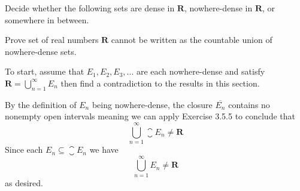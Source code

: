 \begin{exercise}
  Decide whether the following sets are dense in $\mathbf{R}$, nowhere-dense in $\mathbf{R}$, or somewhere in between.
\end{exercise}

\begin{solution}
\end{solution}

\begin{exercise}
  Prove set of real numbers $\mathbf{R}$ cannot be written as the countable union of nowhere-dense sets.
  
  To start, assume that $E_{1}, E_{2}, E_{3}, \ldots$ are each nowhere-dense and satisfy $\mathbf{R}=\bigcup_{n=1}^{\infty} E_{n}$ then find a contradiction to the results in this section.
\end{exercise}

\begin{solution}
  By the definition of $E_n$ being nowhere-dense, the closure $\overline{E_n}$ contains no nonempty open intervals meaning we can apply Exercise 3.5.5 to conclude that
  $$
  \bigcup_{n=1}^\infty \closure{E_n} \ne \mathbf{R}
  $$
  Since each $E_n \subseteq \closure{E_n}$ we have
  $$
  \bigcup_{n=1}^\infty E_n \ne \mathbf{R}
  $$
  as desired.
\end{solution}

